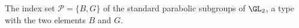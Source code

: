 The index set $\mathcal P=\{B,G\}$ of the standard parabolic subgroups of $\GL_2$, a type with the two elements $B$ and $G$.
